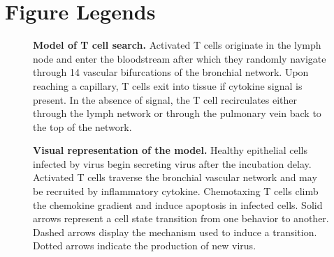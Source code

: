 \documentclass[10pt]{article}
\begin{document}



\section*{Figure Legends}

\begin{figure}[!ht]
\begin{center}
\end{center}
\caption{{\bf Model of T cell search.}  Activated T cells originate in the lymph node and enter the bloodstream after which they randomly navigate through 14 vascular bifurcations of the bronchial network.  Upon reaching a capillary, T cells exit into tissue if cytokine signal is present.  In the absence of signal, the T cell recirculates either through the lymph network or through the pulmonary vein back to the top of the network.}
\label{fig:systemchart}
\end{figure}

\begin{figure}[!ht]
\begin{center}
\end{center}
\caption{{\bf Visual representation of the model.}  Healthy epithelial cells infected by virus begin secreting virus after the incubation delay.  Activated T cells traverse the bronchial vascular network and may be recruited by inflammatory cytokine.  Chemotaxing T cells climb the chemokine gradient and induce apoptosis in infected cells.  Solid arrows represent a cell state transition from one behavior to another.  Dashed arrows display the mechanism used to induce a transition.  Dotted arrows indicate the production of new virus.}
\label{fig:modelchart}
\end{figure}
\end{document}
